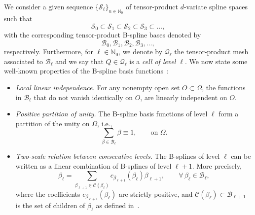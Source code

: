 \documentclass[12pt,a4paper,pdftex]{article}
\theoremstyle{plain}
\theoremstyle{definition}
\theoremstyle{remark}
\newcommand\NN{\mathbb N}
\newcommand\BB{\mathcal B}
\newcommand\QQ{\mathcal Q}
\newcommand\VV{\mathcal S}
\newcommand\CC{\mathcal C}
\begin{document}
We consider a given sequence $\{\VV_\ell\}_{n\in\NN_0}$ of tensor-product $d$-variate spline spaces such that
\begin{equation}\label{E:tensor-product spaces}
 \VV_0\subset \VV_1\subset \VV_2\subset\VV_3\subset\dots,
\end{equation}
with the corresponding tensor-product B-spline bases denoted by
\begin{equation}\label{E:tensor-product basis}
 \BB_0,  \BB_1,  \BB_2, \BB_3,\dots,
\end{equation}
respectively. %
Furthermore, for $\ell\in\NN_0$, we denote by $\QQ_\ell$ the tensor-product mesh associated to $\BB_\ell$ and we say that $Q\in\QQ_\ell$ is a \emph{cell of level $\ell$}. We now state some well-known properties of the B-spline basis functions~\cite{deBoor,Schumaker}:
\begin{itemize}
\item \emph{Local linear independence.} For any nonempty open set $O\subset\Omega$, the functions in $\BB_\ell$ that do not vanish identically on $O$, are linearly independent on $O$.
\item \emph{Positive partition of unity.} The B-spline basis functions of level $\ell$ form a partition of the unity 
on $\Omega$, i.e.,
 \begin{equation}\label{E:partition of unity in B_0}
  \sum_{\beta\in\BB_\ell} \beta \equiv 1,\qquad\text{on }\Omega.
 \end{equation}
\item \emph{Two-scale relation between consecutive levels.} The B-splines of level $\ell$ can be written as a linear combination of B-splines of level $\ell+1$. More precisely, 
\begin{equation}\label{E:two scale relation}
 \beta_\ell = \sum_{\beta_{\ell+1}\in\CC(\beta_{\ell})} 
c_{\beta_{\ell+1}}(\beta_\ell)\beta_{\ell+1}, 
\qquad \forall\,\beta_\ell\in\BB_\ell,
\end{equation}
where the coefficients $c_{\beta_{\ell+1}}(\beta_\ell)$ are strictly positive, and $\CC(\beta_\ell)\subset\BB_{\ell+1}$ is the set of children of $\beta_\ell$ as defined in~\cite{BG15}. 
\end{itemize}
\end{document}
